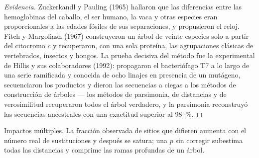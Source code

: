 \begin{proof}[Evidencia]
Zuckerkandl y Pauling (1965) hallaron que las diferencias entre las
hemoglobinas del caballo, el ser humano, la vaca y otras especies eran
proporcionales a las edades fósiles de sus separaciones, y propusieron el
reloj. Fitch y Margoliash (1967) construyeron un árbol de veinte especies
solo a partir del citocromo
$c$ y recuperaron, con una sola proteína, las agrupaciones clásicas de
vertebrados, insectos y hongos. La prueba decisiva del método fue la
 experimental de Hillis y sus colaboradores (1992): propagaron el
bacteriófago T7 a lo largo de una serie ramificada y conocida de ocho
linajes en presencia de un mutágeno, secuenciaron los productos y dieron
las secuencias a ciegas a los métodos de construcción de árboles ---
los métodos de parsimonia, de distancias y de verosimilitud recuperaron
todos el árbol verdadero, y la parsimonia reconstruyó las secuencias
ancestrales con una exactitud superior al
\qty{98}{\%}.
\end{proof}

\begin{omfigure}

{\small Impactos múltiples. La fracción observada de sitios que difieren
aumenta con el número real de sustituciones y después se satura; una $p$
sin corregir subestima todas las distancias y comprime las ramas profundas
de un árbol.}
\end{omfigure}

